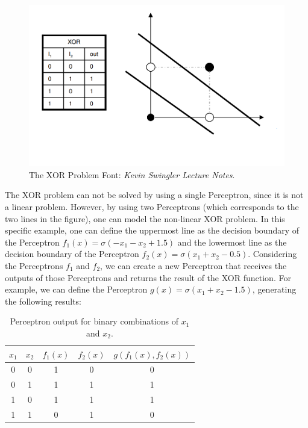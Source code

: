 \begin{figure}
    \centering
    \includegraphics[scale=0.4]{figuras/xor_problem.png}
    \caption{The XOR Problem Font: \emph{Kevin Swingler Lecture Notes}. \label{fig:xor_problem}}
\end{figure}

The XOR problem can not be solved by using a single Perceptron, since it is not a linear problem.
However, by using two Perceptrons (which corresponds to the two lines in the figure), one can model the non-linear XOR problem.  
In this specific example, one can define the uppermost line as the decision boundary of the Perceptron \(f_1(x) = \sigma(- x_1 - x_2 + 1.5)\) and the lowermost line as the decision boundary of the Perceptron \(f_2(x) = \sigma(x_1 + x_2 - 0.5)\).
Considering the Perceptrons \(f_1\) and \(f_2\), we can create a new Perceptron that receives the outputs of those Perceptrons and returns the result of the XOR function. 
For example, we can define the Perceptron \(g(x) = \sigma(x_1 + x_2 - 1.5)\), generating the following results:
\begin{table}[h!]
    \centering
    \begin{tabular}{|c|c|c|c|c|}
    \hline
    $x_1$ & $x_2$ & $f_1(x)$ & $f_2(x)$ & $g(f_1(x), f_2(x))$ \\ \hline
    0     & 0     & 1     & 0     & 0   \\ \hline
    0     & 1     & 1     & 1     & 1   \\ \hline
    1     & 0     & 1     & 1     & 1   \\ \hline
    1     & 1     & 0     & 1     & 0   \\ \hline
    \end{tabular}
    \caption{Perceptron output for binary combinations of \(x_1\) and \(x_2\).}
    \label{tab:xor_table}
\end{table}

